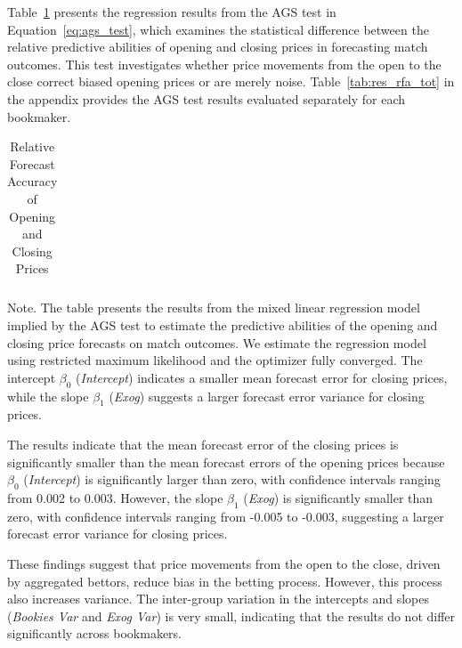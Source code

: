 \documentclass[webpdf,modern,medium]{oup-authoring-template}
\newcommand*\InputTable[1]{}
\theoremstyle{thmstyleone}%
\theoremstyle{thmstyletwo}%
\theoremstyle{thmstylethree}%
\begin{document}
        Table~\ref{tab:res_rfa_re} presents the regression results from the AGS test in Equation~\ref{eq:ags_test}, which examines the statistical difference between the relative predictive abilities of opening and closing prices in forecasting match outcomes. This test investigates whether price movements from the open to the close correct biased opening prices or are merely noise. Table~\ref{tab:res_rfa_tot} in the appendix provides the AGS test results evaluated separately for each bookmaker.

        \begin{table}[htb]

            \caption{Relative Forecast Accuracy of Opening and Closing Prices}
            \label{tab:res_rfa_re}
                \begin{tabular*}{\textwidth}{@{\extracolsep{\fill}}lrrrrrr@{\extracolsep{\fill}}}
                    \toprule
                    \InputTable{res_rfa}
                \end{tabular*}
            \begin{minipage}{\linewidth}Note. The table presents the results from the mixed linear regression model implied by the AGS test to estimate the predictive abilities of the opening and closing price forecasts on match outcomes. We estimate the regression model using restricted maximum likelihood and the optimizer fully converged. The intercept $\beta_0$ (\textit{Intercept}) indicates a smaller mean forecast error for closing prices, while the slope $\beta_1$ (\textit{Exog}) suggests a larger forecast error variance for closing prices.
            \end{minipage}
        \end{table}

        The results indicate that the mean forecast error of the closing prices is significantly smaller than the mean forecast errors of the opening prices because $\beta_0$ (\textit{Intercept}) is significantly larger than zero, with confidence intervals ranging from 0.002 to 0.003. However, the slope $\beta_1$ (\textit{Exog}) is significantly smaller than zero, with confidence intervals ranging from -0.005 to -0.003, suggesting a larger forecast error variance for closing prices.

        These findings suggest that price movements from the open to the close, driven by aggregated bettors, reduce bias in the betting process. However, this process also increases variance.
        The inter-group variation in the intercepts and slopes (\textit{Bookies Var} and \textit{Exog Var}) is very small, indicating that the results do not differ significantly across bookmakers.
\end{document}
